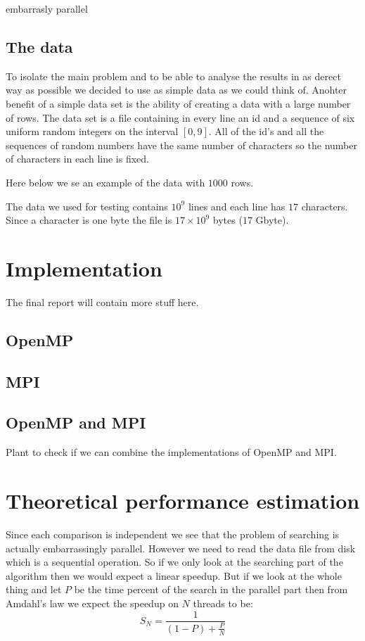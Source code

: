 \documentclass[a4paper,10pt]{article}
\begin{document}
embarrasly parallel


\subsection{The data}
To isolate the main problem and to be able to analyse the results in as derect way as possible we decided to use as simple data as we could think of.
Anohter benefit of a simple data set is the ability of creating a data with a large number of rows. 
The data set is a file containing in every line an id and a sequence of six uniform random integers on the interval $[0,9]$.  
All of the id's and all the sequences of random numbers have the same number of characters so the number of characters in each line is fixed.

Here below we se an example of the data with $1000$ rows.
  
The data we used for testing contains $10^{9}$ lines and each line has $17$ characters.  Since a character is one byte
the file is $17 \times 10^9$ bytes ($17$ Gbyte).

\section{Implementation}
  The final report will contain more stuff here.
\subsection{OpenMP}
 
\subsection{MPI}
  
\subsection{OpenMP and MPI}
  Plant to check if we can combine the implementations of OpenMP and MPI.



\section{Theoretical performance estimation}

Since each comparison is independent we see that the problem of searching is actually embarrassingly parallel.  
However we need to read the data file from disk which is a sequential operation.  
So if we only look at the searching part of the algorithm then we would expect a linear speedup.  
But if we look at the whole thing and let $P$ be the time percent of the search in the parallel  
part then from Amdahl's law we expect the speedup on $N$ threads to be:
$$ S_N = \frac{1}{(1-P)+\frac{P}{N}}$$
\end{document}
